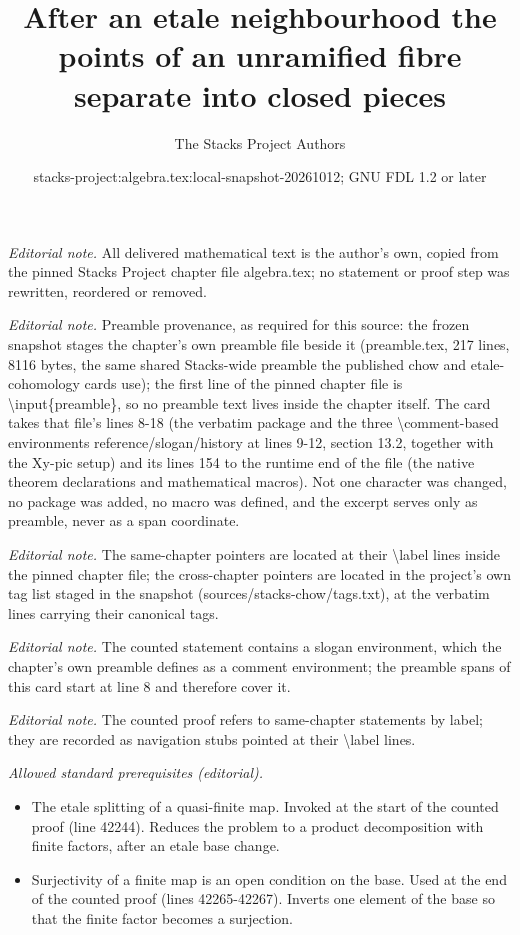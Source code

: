 \documentclass[10pt,a4paper]{amsart}
\title{After an etale neighbourhood the points of an unramified fibre separate into closed pieces}
\author{The Stacks Project Authors}
\date{stacks-project:algebra.tex:local-snapshot-20261012; GNU FDL 1.2 or later}
\theoremstyle{plain}
\theoremstyle{definition}
\theoremstyle{remark}
\numberwithin{equation}{subsection}
\begin{document}
\maketitle
\noindent\textit{Editorial note.} All delivered mathematical text is the author's own, copied from the pinned Stacks Project chapter file algebra.tex; no statement or proof step was rewritten, reordered or removed.\par\medskip
\noindent\textit{Editorial note.} Preamble provenance, as required for this source: the frozen snapshot stages the chapter's own preamble file beside it (preamble.tex, 217 lines, 8116 bytes, the same shared Stacks-wide preamble the published chow and etale-cohomology cards use); the first line of the pinned chapter file is \textbackslash{}input\{preamble\}, so no preamble text lives inside the chapter itself. The card takes that file's lines 8-18 (the verbatim package and the three \textbackslash{}comment-based environments reference/slogan/history at lines 9-12, section 13.2, together with the Xy-pic setup) and its lines 154 to the runtime end of the file (the native theorem declarations and mathematical macros). Not one character was changed, no package was added, no macro was defined, and the excerpt serves only as preamble, never as a span coordinate.\par\medskip
\noindent\textit{Editorial note.} The same-chapter pointers are located at their \textbackslash{}label lines inside the pinned chapter file; the cross-chapter pointers are located in the project's own tag list staged in the snapshot (sources/stacks-chow/tags.txt), at the verbatim lines carrying their canonical tags.\par\medskip
\noindent\textit{Editorial note.} The counted statement contains a slogan environment, which the chapter's own preamble defines as a comment environment; the preamble spans of this card start at line 8 and therefore cover it.\par\medskip
\noindent\textit{Editorial note.} The counted proof refers to same-chapter statements by label; they are recorded as navigation stubs pointed at their \textbackslash{}label lines.\par\medskip
\noindent\textit{Allowed standard prerequisites (editorial).}\begin{itemize}
\item The etale splitting of a quasi-finite map. Invoked at the start of the counted proof (line 42244). Reduces the problem to a product decomposition with finite factors, after an etale base change.
\item Surjectivity of a finite map is an open condition on the base. Used at the end of the counted proof (lines 42265-42267). Inverts one element of the base so that the finite factor becomes a surjection.
\end{itemize}\medskip
\end{document}
